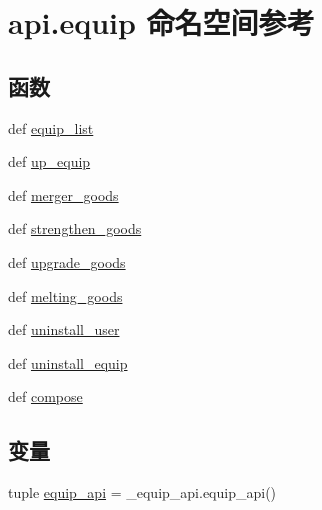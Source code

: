 \hypertarget{namespaceapi_1_1equip}{\section{api.\-equip 命名空间参考}
\label{namespaceapi_1_1equip}
}
\subsection*{函数}
\begin{DoxyCompactItemize}
\item 
def \hyperlink{namespaceapi_1_1equip_a154eff1cef4e172ca8e2f6425be80788}{equip\-\_\-list}
\item 
def \hyperlink{namespaceapi_1_1equip_aac689e501e3de3b42a8a3e3213b6d6aa}{up\-\_\-equip}
\item 
def \hyperlink{namespaceapi_1_1equip_a86f8c9dd010cd325da8f948e82604dc1}{merger\-\_\-goods}
\item 
def \hyperlink{namespaceapi_1_1equip_a7e4e08afa63aa2925d9043c695ff4aa5}{strengthen\-\_\-goods}
\item 
def \hyperlink{namespaceapi_1_1equip_a1ca8bfd9d501861672f285284e66edfb}{upgrade\-\_\-goods}
\item 
def \hyperlink{namespaceapi_1_1equip_a739f8dc246794305a6286aecc33cb976}{melting\-\_\-goods}
\item 
def \hyperlink{namespaceapi_1_1equip_a9c68476295fa5c9585a42e2e90d8152a}{uninstall\-\_\-user}
\item 
def \hyperlink{namespaceapi_1_1equip_a3d9eaf1bda4a4a074cc5add8c0e9acf1}{uninstall\-\_\-equip}
\item 
def \hyperlink{namespaceapi_1_1equip_a42998316229c974d0bdd780c1c78af9c}{compose}
\end{DoxyCompactItemize}
\subsection*{变量}
\begin{DoxyCompactItemize}
\item 
tuple \hyperlink{namespaceapi_1_1equip_a892512a763e8add6a99b993ad5295e06}{equip\-\_\-api} = \-\_\-equip\-\_\-api.\-equip\-\_\-api()
\end{DoxyCompactItemize}


